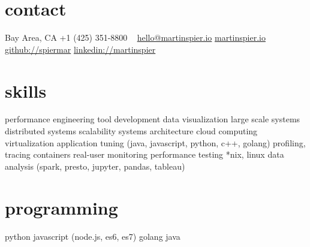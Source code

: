 \begin{aside}
    \section{contact}
        Bay Area, CA
        +1 (425) 351-8800
        ~
        \href{mailto:hello@martinspier.io}{hello@martinspier.io}
        \href{http://martinspier.io}{martinspier.io}
        \href{https://github.com/spiermar}{github://spiermar}
        \href{https://www.linkedin.com/in/martinspier}{linkedin://martinspier}
    \section{skills}
        performance engineering
        tool development
        data visualization
        large scale systems
        distributed systems
        scalability
        systems architecture
        cloud computing
        virtualization
        application tuning
        (java, javascript, python, c++, golang)
        profiling, tracing
        containers
        real-user monitoring
        performance testing
        *nix, linux
        data analysis
        (spark, presto, jupyter, pandas, tableau)
        \section{programming}
        python
        javascript
        (node.js, es6, es7)
        golang
        java
\end{aside}